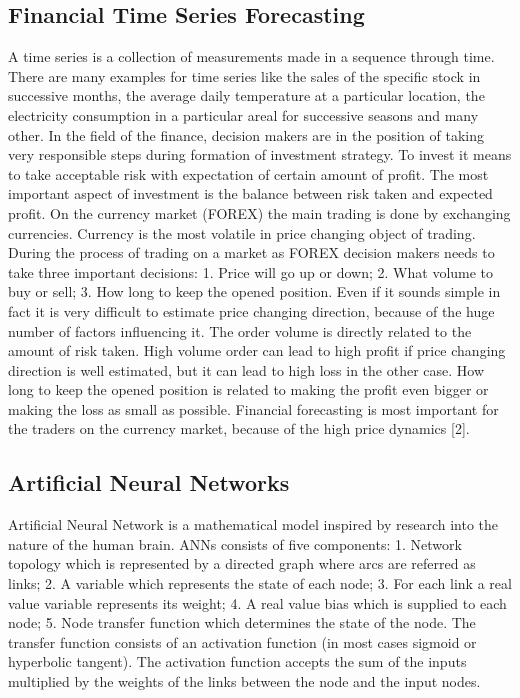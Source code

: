 \documentclass{llncs}
\begin{document}
\subsection{Financial Time Series Forecasting}
%
A time series is a collection of measurements made in a sequence through time. There are many examples for time series like the sales of the specific stock in successive months, the average daily temperature at a particular location, the electricity consumption in a particular areal for successive seasons and many other. In the field of the finance, decision makers are in the position of taking very responsible steps during formation of investment strategy. To invest it means to take acceptable risk with expectation of certain amount of profit. The most important aspect of investment is the balance between risk taken and expected profit. On the currency market (FOREX) the main trading is done by exchanging currencies. Currency is the most volatile in price changing object of trading. During the process of trading on a market as FOREX decision makers needs to take three important decisions: 1. Price will go up or down; 2. What volume to buy or sell; 3. How long to keep the opened position. Even if it sounds simple in fact it is very difficult to estimate price changing direction, because of the huge number of factors influencing it. The order volume is directly related to the amount of risk taken. High volume order can lead to high profit if price changing direction is well estimated, but it can lead to high loss in the other case. How long to keep the opened position is related to making the profit even bigger or making the loss as small as possible. Financial forecasting is most important for the traders on the currency market, because of the high price dynamics [2].
%
\subsection{Artificial Neural Networks}
%
Artificial Neural Network is a mathematical model inspired by research into the nature of the human brain. ANNs consists of five components: 1. Network topology which is represented by a directed graph where arcs are referred as links; 2. A variable which represents the state of each node; 3. For each link a real value variable represents its weight; 4. A real value bias which is supplied to each node; 5. Node transfer function which determines the state of the node. The transfer function consists of an activation function (in most cases sigmoid or hyperbolic tangent). The activation function accepts the sum of the inputs multiplied by the weights of the links between the node and the input nodes.
\end{document}

